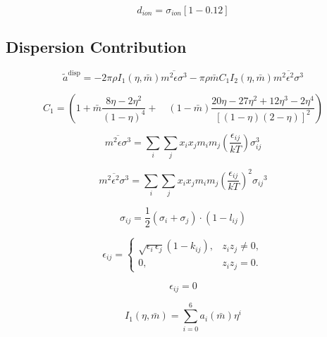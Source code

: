 \documentclass[12pt, letterpaper]{article}
\begin{document}
\begin{equation}
d_{ion}=\sigma_{ion}\left[1-0.12\right]
\end{equation}

\subsection{Dispersion Contribution}

\cite{Gross2001}

\begin{equation}
\tilde{a}^{\mathrm{disp}}=-2 \pi \rho I_1(\eta, \bar{m}) \overline{m^2 \epsilon \sigma^3}-\pi \rho \bar{m} C_1 I_2(\eta, \bar{m}) \overline{m^2 \epsilon^2 \sigma^3}
\end{equation}

\begin{equation}
C_1 = \left(1+\bar{m} \frac{8 \eta-2 \eta^2}{(1-\eta)^4}+\right.\left.\quad(1-\bar{m}) \frac{20 \eta-27 \eta^2+12 \eta^3-2 \eta^4}{[(1-\eta)(2-\eta)]^2}\right)
\end{equation}

\begin{equation}
\overline{m^2 \epsilon \sigma^3}=\sum_i \sum_j x_i x_j m_i m_j\left(\frac{\epsilon_{i j}}{k T}\right) \sigma_{i j}^3
\end{equation}

\begin{equation}
\overline{m^2 \epsilon^2 \sigma^3}=\sum_i \sum_j x_i x_j m_i m_j\left(\frac{\epsilon_{i j}}{k T}\right)^2 \sigma_{i j}{ }^3
\end{equation}

\begin{equation}
\sigma_{i j}=\frac{1}{2}\left(\sigma_i+\sigma_j\right) \cdot \left(1- l_{ij} \right)
\end{equation}

\begin{equation}
\epsilon_{ij}=
\begin{cases}
\sqrt{\epsilon_i\,\epsilon_j}\left(1-k_{ij}\right), & z_i z_j \neq 0,\\[6pt]
0, & z_i z_j = 0 .
\end{cases}
\end{equation}

\begin{equation}
\epsilon_{i j}= 0
\end{equation}

\begin{equation}
I_1(\eta, \bar{m})=\sum_{i=0}^6 a_i(\bar{m}) \eta^i
\end{equation}
\end{document}
